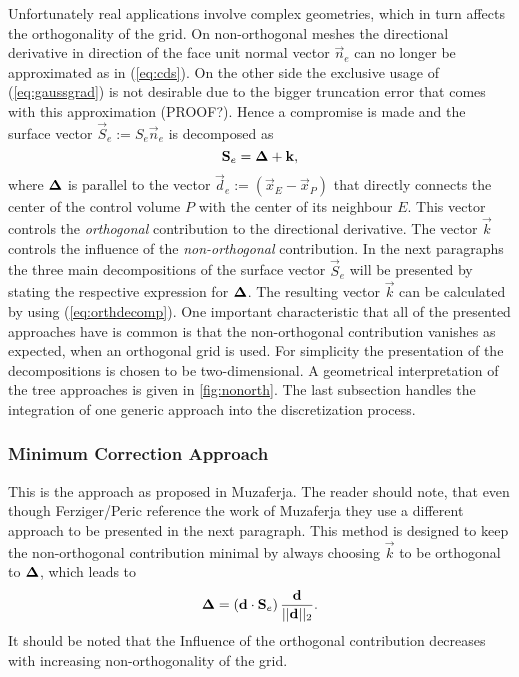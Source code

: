     Unfortunately real applications involve complex geometries, which in turn affects the orthogonality of the grid. On non-orthogonal meshes the directional derivative in direction of the face unit normal vector \(\vec{n}_e\) can no longer be approximated as in (\ref{eq:cds}). On the other side the exclusive usage of (\ref{eq:gaussgrad}) is not desirable due to the bigger truncation error that comes with this approximation (PROOF?). Hence a compromise is made and the surface vector \(\vec{S}_e := S_e \vec{n}_e\) is decomposed as
    \begin{equation}
      \label{eq:orthdecomp}
      \mathbf{S}_e = \boldsymbol{\Delta} + \mathbf{k},
    \end{equation}
    where \(\boldsymbol{\Delta}\) is parallel to the vector \(\vec{d}_e := \left(\vec{x}_E - \vec{x}_P\right)\) that directly connects the center of the control volume \(P\) with the center of its neighbour \(E\). This vector controls the \emph{orthogonal} contribution to the directional derivative. The vector \(\vec{k}\) controls the influence of the \emph{non-orthogonal} contribution. In the next paragraphs the three main decompositions of the surface vector \(\vec{S}_e\) will be presented by stating the respective expression for \(\boldsymbol{\Delta}\). The resulting vector \(\vec{k}\) can be calculated by using (\ref{eq:orthdecomp}). One important characteristic that all of the presented approaches have is common is that the non-orthogonal contribution vanishes as expected, when an orthogonal grid is used. For simplicity the presentation of the decompositions is chosen to be two-dimensional. A geometrical interpretation of the tree approaches is given in \ref{fig:nonorth}. The last subsection handles the integration of one generic approach into the discretization process.

      \subsubsection{Minimum Correction Approach}

      This is the approach as proposed in Muzaferja. The reader should note, that even though Ferziger/Peric reference the work of Muzaferja they use a different approach to be presented in the next paragraph. This method is designed to keep the non-orthogonal contribution minimal by always choosing \(\vec{k}\) to be orthogonal to \(\boldsymbol{\Delta}\), which leads to
      \begin{displaymath}
        \boldsymbol{\Delta} = \left( \mathbf{d} \cdot \mathbf{S}_e \right) \frac{\mathbf{d}}{||\mathbf{d}||_2}.
      \end{displaymath}
      It should be noted that the Influence of the orthogonal contribution decreases with increasing non-orthogonality of the grid.

